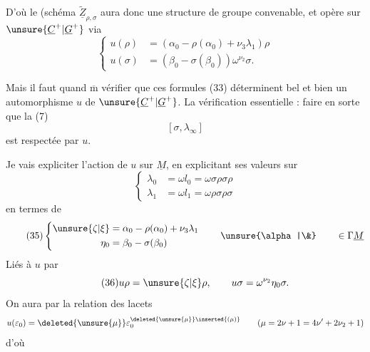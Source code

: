 

D'où le  (schéma 
$\widetilde{\underline Z}_{\rho,\sigma}$ aura donc
une structure de groupe convenable, et
opère sur $\unsure{\underline C^{+}|\underline G^{+}}$ via
\[
\tag{33}
\left\{\begin{aligned}
u(\rho)&=(\alpha_0-\rho(\alpha_0)+\nu_3\lambda_1)\rho\\
u(\sigma)&=(\beta_0-\sigma(\beta_0))\omega^{\nu_2}\sigma.
\end{aligned}\right.
\]

Mais il faut quand $\overline{\mathrm m}$ vérifier que
ces formules (33) déterminent bel et
bien un automorphisme $u$ de $\unsure{\underline C^{+}|\underline G^{+}}$. La
vérification essentielle : faire en sorte
que la  (7)
\[
\tag{34}[\sigma,\lambda_\infty]
\]
est respectée par $u$.

Je vais expliciter l'action de $u$ sur
$\underline M$, en explicitant ses valeurs sur
\[
\left\{\begin{aligned}
\lambda_0&=\omega l_0=\omega\sigma\rho\sigma\rho\\
\lambda_1&=\omega l_1=\omega\rho\sigma\rho\sigma
\end{aligned}\right.
\]
en termes de 
\[
\tag{35}
\left\{\begin{aligned}
\unsure{\zeta|\xi}&=\alpha_0-\rho(\alpha_0)+\nu_3\lambda_1\\
\eta_0&=\beta_0-\sigma(\beta_0)
\end{aligned}\right.
\qquad\unsure{\alpha|\&}\qquad\in\Gamma\underline M
\]
Liés à $u$ par
\[
\tag{36}
u\rho=\unsure{\zeta|\xi}\rho,\qquad
u\sigma=\omega^{\nu_2}\eta_0\sigma.
\]
On aura  par la relation des lacets
\[
u(\varepsilon_0)=\deleted{\unsure{\mu}}\varepsilon_0^{\deleted{\unsure{\mu}}\inserted{(\mu)}}
\qquad(\mu=2\nu+1=4\nu'+2\nu_2+1)
\]
d'où


